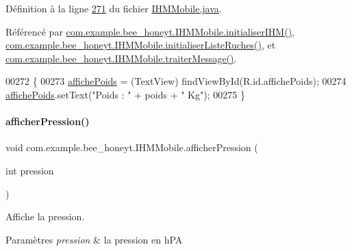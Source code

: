 Définition à la ligne \hyperlink{_i_h_m_mobile_8java_source_l00271}{271} du fichier \hyperlink{_i_h_m_mobile_8java_source}{I\+H\+M\+Mobile.\+java}.



Référencé par \hyperlink{_i_h_m_mobile_8java_source_l00152}{com.\+example.\+bee\+\_\+honeyt.\+I\+H\+M\+Mobile.\+initialiser\+I\+H\+M()}, \hyperlink{_i_h_m_mobile_8java_source_l00170}{com.\+example.\+bee\+\_\+honeyt.\+I\+H\+M\+Mobile.\+initialiser\+Liste\+Ruches()}, et \hyperlink{_i_h_m_mobile_8java_source_l00374}{com.\+example.\+bee\+\_\+honeyt.\+I\+H\+M\+Mobile.\+traiter\+Message()}.


\begin{DoxyCode}
00272     \{
00273         \hyperlink{classcom_1_1example_1_1bee__honeyt_1_1_i_h_m_mobile_a83854ea1a388eb4919c953ef00e8fa7f}{affichePoids} = (TextView) findViewById(R.id.affichePoids);
00274         \hyperlink{classcom_1_1example_1_1bee__honeyt_1_1_i_h_m_mobile_a83854ea1a388eb4919c953ef00e8fa7f}{affichePoids}.setText(\textcolor{stringliteral}{"Poids : "} + poids + \textcolor{stringliteral}{" Kg"});
00275     \}
\end{DoxyCode}
\mbox{\label{classcom_1_1example_1_1bee__honeyt_1_1_i_h_m_mobile_a92bb00501214f2f5f9805a005f1ecdaa}} 
\paragraph{\texorpdfstring{afficher\+Pression()}{afficherPression()}}
{\footnotesize\ttfamily void com.\+example.\+bee\+\_\+honeyt.\+I\+H\+M\+Mobile.\+afficher\+Pression (\begin{DoxyParamCaption}\item[{int}]{pression }\end{DoxyParamCaption})}



Affiche la pression. 


\begin{DoxyParams}{Paramètres}
{\em pression} & la pression en h\+PA \\
\hline
\end{DoxyParams}


